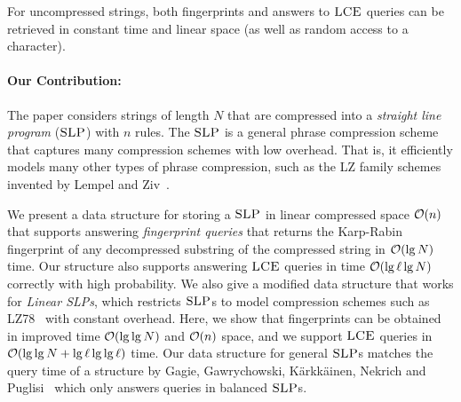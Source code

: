 
For uncompressed strings, both fingerprints and answers to $\textsc{LCE}$ queries can be retrieved in constant time and linear space (as well as random access to a character). 


\paragraph{Our Contribution: } 
The paper considers strings of length $N$ that are compressed into a \emph{straight line program} ($\textsc{SLP}$) with $n$ rules. The $\textsc{SLP}$ is a general phrase compression scheme that captures many compression schemes with low overhead. That is, it efficiently models many other types of phrase compression, such as the LZ family schemes invented by Lempel and Ziv~\cite{lz1977,lz1978}. 

We present a data structure for storing a $\textsc{SLP}$ in linear compressed space $\mathcal{O}(n)$ that supports answering \emph{fingerprint queries} that returns the Karp-Rabin fingerprint of any decompressed substring of the compressed string in $\mathcal{O}(\lg N)$ time. 
Our structure also supports answering $\textsc{LCE}$ queries in time $\mathcal{O}(\lg \ell \lg N)$ correctly with high probability.
We also give a modified data structure that works for \emph{Linear SLPs}, which restricts $\textsc{SLP}$s to model compression schemes such as LZ78~\cite{lz1978} with constant overhead. Here, we show that fingerprints can be obtained in improved time $\mathcal{O}(\lg \lg N)$ and $\mathcal{O}(n)$ space, and we support $\textsc{LCE}$ queries in $\mathcal{O}(\lg \lg N + \lg \ell \lg \lg \ell)$ time.
Our data structure for general $\textsc{SLP}$s matches the query time of a structure by Gagie, Gawrychowski, K{\"a}rkk{\"a}inen, Nekrich and Puglisi~\cite{gagiefingerprint} which only answers queries in balanced $\textsc{SLP}$s.

